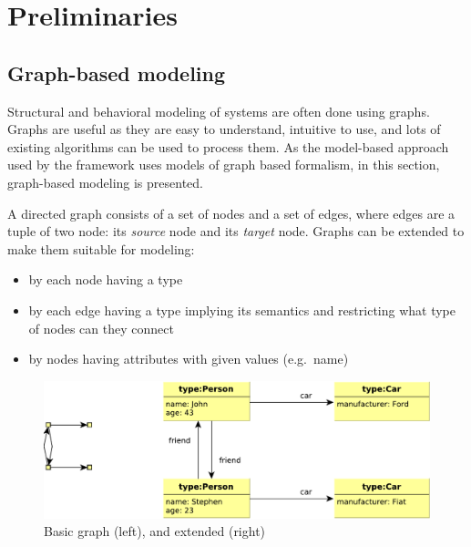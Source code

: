
\chapter{Preliminaries}


\section{Graph-based modeling}

Structural and behavioral modeling of systems are often done using graphs. 
Graphs are useful as they are easy to understand, intuitive to use, and lots of existing algorithms can be used to process them. 
As the model-based approach used by the framework uses models of graph based formalism, in this section, graph-based modeling is presented.

A directed graph consists of a set of nodes and a set of edges, where edges are a tuple of two node: its \emph{source} node and its \emph{target} node. 
Graphs can be extended to make them suitable for modeling:

\begin{itemize}
	\item by each node having a type
	\item by each edge having a type implying its semantics and restricting what type of nodes can they connect
	\item by nodes having attributes with given values (e.g.\ name)
\end{itemize}


\begin{figure}[h]
	\begin{center}
		\includegraphics[width=\textwidth]{figures/graphs.pdf}
		\caption{Basic graph (left), and extended (right) }
		\label{fig:graphs}
	\end{center}
\end{figure}

